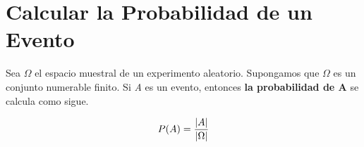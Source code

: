 \section{Calcular la Probabilidad de un Evento}
Sea $\Omega$ el espacio muestral de un experimento aleatorio. Supongamos que $\Omega$ es un conjunto numerable finito. Si \textit{A} es un evento, entonces \textbf{la probabilidad de A} se calcula como sigue.

\[P(A) = \frac{\abs*{A}}{\abs*{\Omega}}\]
